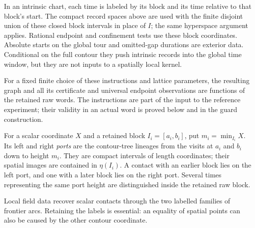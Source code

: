 In an intrinsic chart, each time is labeled by its block and its time relative to that block's start. The compact record spaces above are used with the finite disjoint union of these closed block intervals in place of \(I\); the same hyperspace argument applies. Rational endpoint and confinement tests use these block coordinates. Absolute starts on the global tour and omitted-gap durations are exterior data. Conditional on the full contour they push intrinsic records into the global time window, but they are not inputs to a spatially local kernel.

For a fixed finite choice of these instructions and lattice parameters, the resulting graph and all its certificate and universal endpoint observations are functions of the retained raw words. The instructions are part of the input to the reference experiment; their validity in an actual word is proved below and in the guard construction.

For a scalar coordinate \(X\) and a retained block \(I_i=[a_i,b_i]\), put \(m_i=\min_{I_i}X\). Its left and right \emph{ports} are the contour-tree lineages from the visits at \(a_i\) and \(b_i\) down to height \(m_i\). They are compact intervals of length coordinates; their spatial images are contained in \(\eta(I_i)\). A contact with an earlier block lies on the left port, and one with a later block lies on the right port. Several times representing the same port height are distinguished inside the retained raw block.

Local field data recover scalar contacts through the two labelled families
of frontier arcs. Retaining the labels is essential: an equality of spatial
points can also be caused by the other contour coordinate.

